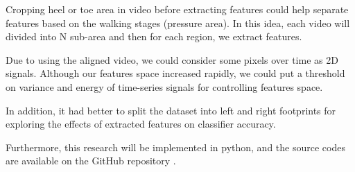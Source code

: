 Cropping heel or toe area in video before extracting features could help separate features based on the walking stages (pressure area). In this idea, each video will divided into N sub-area and then for each region, we extract features. 

Due to using the aligned video, we could consider some pixels over time as 2D signals. Although our features space increased rapidly, we could put a threshold on variance and energy of time-series signals for controlling features space. 

In addition, it had better to split the dataset into left and right footprints for exploring the effects of extracted features on classifier accuracy. 

 
Furthermore, this research will be implemented in python, and the source codes are available on the GitHub repository \cite{SKazemii/EE6563}. 

